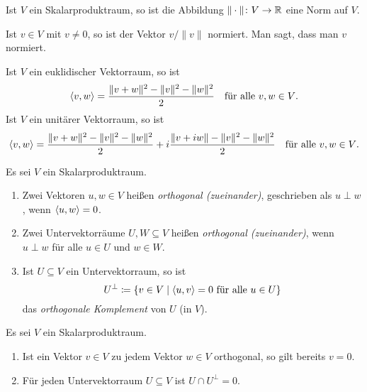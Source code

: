 \begin{corollary}
  Ist $V$ ein Skalarproduktraum, so ist die Abbildung $\|\cdot\| \colon V \to \mathbb{R}$ eine Norm auf $V$.
\end{corollary}


\begin{remark}
  Ist $v \in V$ mit $v \neq 0$, so ist der Vektor $v/\|v\|$ normiert.
  Man sagt, dass man $v$ normiert.
\end{remark}


\begin{lemma}[Polarisationsformel]
  Ist $V$ ein euklidischer Vektorraum, so ist
  \[
    \left\langle v,w \right\rangle = \frac{\|v+w\|^2 - \|v\|^2 - \|w\|^2}{2}
    \quad\text{für alle $v, w \in V$}.
  \]
  Ist $V$ ein unitärer Vektorraum, so ist
  \[
    \left\langle v,w \right\rangle = \frac{\|v+w\|^2-\|v\|^2-\|w\|^2}{2} + i \frac{\|v+iw\|-\|v\|^2-\|w\|^2}{2}
    \quad\text{für alle $v, w \in V$}.
  \]
\end{lemma}



\begin{definition}
  Es sei $V$ ein Skalarproduktraum.
  \begin{enumerate}[leftmargin=*, label=\roman*)]
    \item
      Zwei Vektoren $u, w \in V$ heißen \emph{orthogonal (zueinander)}, geschrieben als $u \perp w$, wenn $\left\langle u, w \right\rangle = 0$.
    \item
      Zwei Untervektorräume $U, W \subseteq V$ heißen \emph{orthogonal (zueinander)}, wenn $u \perp w$ für alle $u \in U$ und $w \in W$.
    \item
      Ist $U \subseteq V$ ein Untervektorraum, so ist
      \[
        U^\perp
        \coloneqq
        \{
          v \in V
          \mid
          \text{$\left\langle u, v \right\rangle = 0$ für alle $u \in U$}
        \}
      \]
      das \emph{orthogonale Komplement} von $U$ (in $V$).
  \end{enumerate}
\end{definition}


\begin{lemma}
  Es sei $V$ ein Skalarproduktraum.
  \begin{enumerate}[leftmargin=*, label=\roman*)]
    \item
      Ist ein Vektor $v \in V$ zu jedem Vektor $w \in V$ orthogonal, so gilt bereits $v = 0$.
    \item
      Für jeden Untervektorraum $U \subseteq V$ ist $U \cap U^\perp = 0$.
  \end{enumerate}
\end{lemma}


